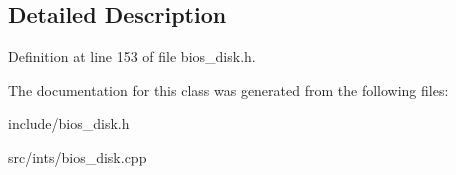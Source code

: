\subsection{Detailed Description}


Definition at line 153 of file bios\-\_\-disk.\-h.



The documentation for this class was generated from the following files\-:\begin{DoxyCompactItemize}
\item 
include/bios\-\_\-disk.\-h\item 
src/ints/bios\-\_\-disk.\-cpp\end{DoxyCompactItemize}
